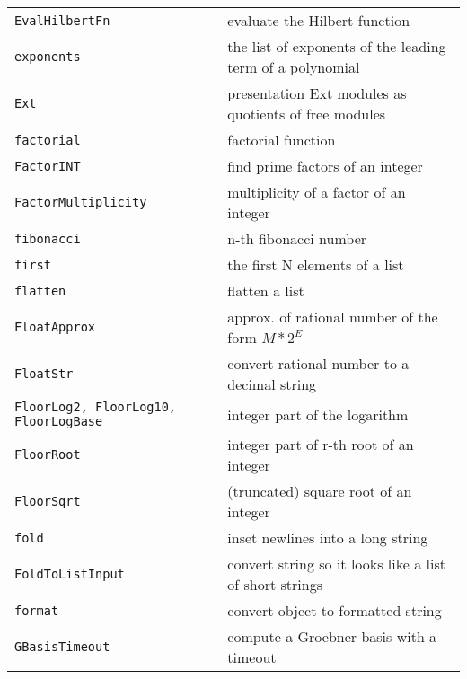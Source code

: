 \documentclass[a4paper]{mybook}
\begin{document}
\begin{center}
\begin{longtable}{ll}
{\verb~EvalHilbertFn~} &
      evaluate the Hilbert function\\
   
{\verb~exponents~} &
      the list of exponents of the leading term of a polynomial\\
   
{\verb~Ext~} &
      presentation Ext modules as quotients of free modules\\
   
{\verb~factorial~} &
      factorial function\\
   
{\verb~FactorINT~} &
      find prime factors of an integer\\
   
{\verb~FactorMultiplicity~} &
      multiplicity of a factor of an integer\\
   
{\verb~fibonacci~} &
      n-th fibonacci number\\
   
{\verb~first~} &
      the first N elements of a list\\
   
{\verb~flatten~} &
      flatten a list\\
   
{\verb~FloatApprox~} &
      approx. of rational number of the form $M*2^E$\\
   
{\verb~FloatStr~} &
      convert rational number to a decimal string\\
   
{\verb~FloorLog2, FloorLog10, FloorLogBase~} &
      integer part of the logarithm\\
   
{\verb~FloorRoot~} &
      integer part of r-th root of an integer\\
   
{\verb~FloorSqrt~} &
      (truncated) square root of an integer\\
   
{\verb~fold~} &
      inset newlines into a long string\\
   
{\verb~FoldToListInput~} &
      convert string so it looks like a list of short strings\\
   
{\verb~format~} &
      convert object to formatted string\\
   
{\verb~GBasisTimeout~} &
      compute a Groebner basis with a timeout\\
   

\end{longtable}
\end{center}
\end{document}
